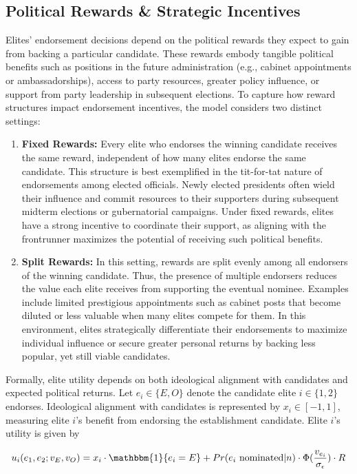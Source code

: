 \subsection*{Political Rewards \& Strategic Incentives}
Elites' endorsement decisions depend on the political rewards they expect to gain from backing a particular candidate. These rewards embody tangible political benefits such as positions in the future administration (e.g., cabinet appointments or ambassadorships), access to party resources, greater policy influence, or support from party leadership in subsequent elections. To capture how reward structures impact endorsement incentives, the model considers two distinct settings:

\begin{enumerate}
\item \textbf{Fixed Rewards:} Every elite who endorses the winning candidate receives the same reward, independent of how many elites endorse the same candidate. This structure is best exemplified in the tit-for-tat nature of endorsements among elected officials. Newly elected presidents often wield their influence and commit resources to their supporters during subsequent midterm elections or gubernatorial campaigns. Under fixed rewards, elites have a strong incentive to coordinate their support, as aligning with the frontrunner maximizes the potential of receiving such political benefits.

\item \textbf{Split Rewards:} In this setting, rewards are split evenly among all endorsers of the winning candidate. Thus, the presence of multiple endorsers reduces the value each elite receives from supporting the eventual nominee. Examples include limited prestigious appointments such as cabinet posts that become diluted or less valuable when many elites compete for them. In this environment, elites strategically differentiate their endorsements to maximize individual influence or secure greater personal returns by backing less popular, yet still viable candidates.
\end{enumerate}

Formally, elite utility depends on both ideological alignment with candidates and expected political returns. Let $e_i \in \{E, O\}$ denote the candidate elite $i \in \{1,2\}$ endorses. Ideological alignment with candidates is represented by $x_i \in [-1,1]$, measuring elite $i$'s benefit from endorsing the establishment candidate. Elite $i$'s utility is given by

\[u_i(e_1, e_2; v_E, v_O) = x_i\cdot \mathbbm{1}\{e_i = E\} + Pr(e_i \text{ nominated}|n)\cdot \Phi(\frac{v_{e_i}}{\sigma_{\epsilon}})\cdot R\]

